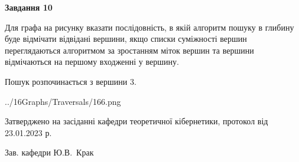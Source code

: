 \documentclass[12pt, ukrainian]{article}
\begin{document}
{\begin {large}
{\begin {center}\textbf{Завдання 10}\end {center}}\par
Для графа на рисунку вказати послідовність, в якій алгоритм пошуку в глибину буде відмічати відвідані вершини, якщо списки суміжності вершин переглядаються алгоритмом за зростанням міток вершин та вершини відмічаються на першому вход\-женні у вершину.\par
Пошук розпочинається з вершини 3.\par

\begin{center}
	{../16Graphs/Traversals/166.png}
\end{center}\par
\newpage


\end {large}
}
{\smallskip \begin {small} Затверджено на засіданні кафедри теоретичної кібернетики, протокол  від   23.01.2023 р.\par\smallskip\smallskip
{\parbox {6.5 cm}{Зав. кафедри \dotfill Ю.В.~Крак}} \end{small}}
\end{document}

